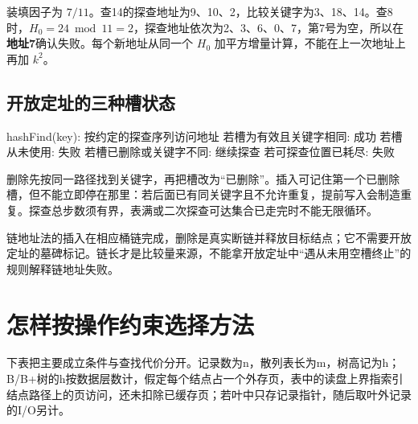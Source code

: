 装填因子为 \(7/11\)。查14的探查地址为9、10、2，比较关键字为3、18、14。查8时，\(H_0=24\bmod11=2\)，探查地址依次为2、3、6、0、7，第7号为空，所以在\textbf{地址7}确认失败。每个新地址从同一个 \(H_0\) 加平方增量计算，不能在上一次地址上再加 \(k^2\)。

\subsection{开放定址的三种槽状态}\label{DS07-hash-code}

\par\medskip\noindent\begin{minipage}{\linewidth}
\begin{codeblock}[language={}]
hashFind(key):
    按约定的探查序列访问地址
    若槽为有效且关键字相同: 成功
    若槽从未使用: 失败
    若槽已删除或关键字不同: 继续探查
    若可探查位置已耗尽: 失败
\end{codeblock}
\end{minipage}\par\medskip

删除先按同一路径找到关键字，再把槽改为``已删除''。插入可记住第一个已删除槽，但不能立即停在那里：若后面已有同关键字且不允许重复，提前写入会制造重复。探查总步数须有界，表满或二次探查可达集合已走完时不能无限循环。

链地址法的插入在相应桶链完成，删除是真实断链并释放目标结点；它不需要开放定址的墓碑标记。链长才是比较量来源，不能拿开放定址中``遇从未用空槽终止''的规则解释链地址失败。

\section{怎样按操作约束选择方法}\label{DS07-10}

下表把主要成立条件与查找代价分开。记录数为n，散列表长为m，树高记为h；B/B+树的h按数据层数计，假定每个结点占一个外存页，表中的读盘上界指索引结点路径上的页访问，还未扣除已缓存页；若叶中只存记录指针，随后取叶外记录的I/O另计。


